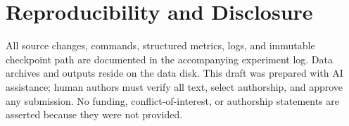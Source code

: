 \documentclass{article}
\begin{document}
\section{Reproducibility and Disclosure}
All source changes, commands, structured metrics, logs, and immutable checkpoint
path are documented in the accompanying experiment log. Data archives and
outputs reside on the data disk. This draft was prepared with AI assistance;
human authors must verify all text, select authorship, and approve any
submission. No funding, conflict-of-interest, or authorship statements are
asserted because they were not provided.



\end{document}
